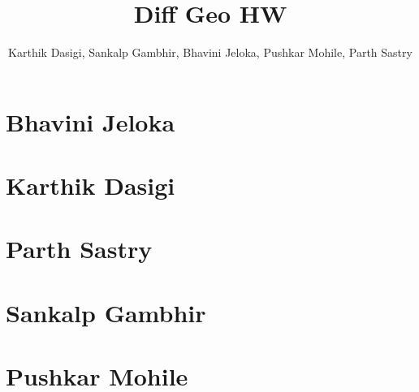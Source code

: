 \documentclass[aspectratio=169]{beamer}
\title{Diff Geo HW}
\author{ %
    Karthik Dasigi,
    Sankalp Gambhir,
    Bhavini Jeloka,
    Pushkar Mohile, 
    Parth Sastry
}
\begin{document}
    \frame{\titlepage}

    \section{Bhavini Jeloka}
    
    

    \section{Karthik Dasigi}
    
    

    \section{Parth Sastry}
    
    

    \section{Sankalp Gambhir}
    
    

    \section{Pushkar Mohile}
    
\end{document}
